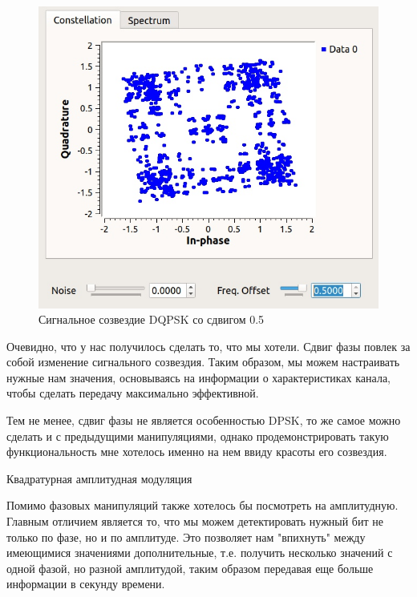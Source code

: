 		\begin{figure}[H]
		\begin{center}
			\includegraphics[scale=0.4]{../dqpsk_shift.jpg}
			\caption{Сигнальное созвездие DQPSK со сдвигом 0.5} 
		\end{center}
	\end{figure}
	Очевидно, что у нас получилось сделать то, что мы хотели. Сдвиг фазы повлек за собой изменение сигнального созвездия. Таким образом, мы можем настраивать нужные нам значения, основываясь на информации о характеристиках канала, чтобы сделать передачу максимально эффективной.
	\par
	Тем не менее, сдвиг фазы не является особенностью DPSK, то же самое можно сделать и с предыдущими манипуляциями, однако продемонстрировать такую функциональность мне хотелось именно на нем ввиду красоты его созвездия.
	
	\newpage
	\begin{center}
		\large {Квадратурная амплитудная модуляция}
	\end{center}
	Помимо фазовых манипуляций также хотелось бы посмотреть на амплитудную. Главным отличием является то, что мы можем детектировать нужный бит не только по фазе, но и по амплитуде. Это позволяет нам "впихнуть" между имеющимися значениями дополнительные, т.е. получить несколько значений с одной фазой, но разной амплитудой, таким образом передавая еще больше информации в секунду времени.

